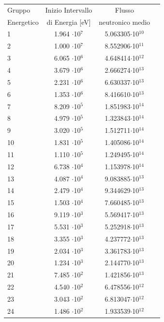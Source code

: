 \begin{table}[!htb]
\tiny
\centering
 \begin{tabular}{lccc}
\toprule
Gruppo  & Inizio Intervallo  & Flusso  \\
Energetico & di Energia [eV]  & neutronico medio \\       
\midrule
1 & 1.964 $\cdot$10$^7$  &  5.063305$\cdot$10$^{10}$  \\           
2 & 1.000 $\cdot$10$^7$  &  8.552906$\cdot$10$^{11}$  \\
3 & 6.065 $\cdot$10$^6$  &  4.648414$\cdot$10$^{12}$  \\
4 & 3.679 $\cdot$10$^6$  &  2.666274$\cdot$10$^{13}$  \\
5 & 2.231 $\cdot$10$^6$  &  6.630337$\cdot$10$^{13}$  \\
6 & 1.353 $\cdot$10$^6$  &  8.416610$\cdot$10$^{13}$  \\
7 & 8.209 $\cdot$10$^5$  &  1.851983$\cdot$10$^{14}$  \\
8 & 4.979 $\cdot$10$^5$  &  1.323843$\cdot$10$^{14}$  \\
9 & 3.020 $\cdot$10$^5$  &  1.512711$\cdot$10$^{14}$  \\
10 & 1.831 $\cdot$10$^5$ &  1.405086$\cdot$10$^{14}$  \\
11 & 1.110 $\cdot$10$^5$ &  1.249495$\cdot$10$^{14}$  \\
12 & 6.738 $\cdot$10$^4$ &  1.153978$\cdot$10$^{14}$  \\
13 & 4.087 $\cdot$10$^4$ &  9.083885$\cdot$10$^{13}$  \\
14 & 2.479 $\cdot$10$^4$ &  9.344629$\cdot$10$^{13}$  \\
15 & 1.503 $\cdot$10$^4$ &  7.660485$\cdot$10$^{13}$  \\
16 & 9.119 $\cdot$10$^3$ &  5.569417$\cdot$10$^{13}$  \\
17 & 5.531 $\cdot$10$^3$ &  5.252918$\cdot$10$^{13}$  \\
18 & 3.355 $\cdot$10$^3$ &  4.237772$\cdot$10$^{13}$  \\
19 & 2.034 $\cdot$10$^3$ &  3.361783$\cdot$10$^{13}$  \\
20 & 1.234 $\cdot$10$^3$ &  2.144770$\cdot$10$^{13}$  \\
21 & 7.485 $\cdot$10$^2$ &  1.421856$\cdot$10$^{13}$  \\
22 & 4.540 $\cdot$10$^2$ &  6.478556$\cdot$10$^{12}$  \\
23 & 3.043 $\cdot$10$^2$ &  6.813047$\cdot$10$^{12}$  \\
24 & 1.486 $\cdot$10$^2$ &  1.933539$\cdot$10$^{12}$  \\

\end{tabular}
\end{table}
